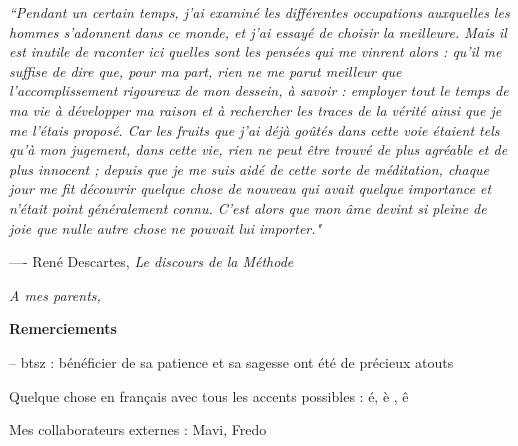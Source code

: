 \documentclass[12pt]{book}
\title{}
\date{}
\author{}
\begin{document}
\thispagestyle{empty}

\vspace*{5cm}

\textit{``Pendant un certain temps, j'ai examin\'e les diff\'erentes
occupations auxquelles les hommes s'adonnent dans ce monde, et j'ai
essay\'e de choisir la meilleure. Mais il est inutile de raconter ici
quelles sont les pens\'ees qui me vinrent alors : qu'il me suffise de
dire que, pour ma part, rien ne me parut meilleur que
l'accomplissement rigoureux de mon dessein, \`a savoir : employer tout
le temps de ma vie \`a d\'evelopper ma raison et \`a rechercher les
traces de la v\'erit\'e ainsi que je me l'\'etais propos\'e. Car les
fruits que j'ai d\'ej\`a go\^ut\'es dans cette voie \'etaient tels
qu'\`a mon jugement, dans cette vie, rien ne peut \^etre trouv\'e de
plus agr\'eable et de plus innocent ; depuis que je me suis aid\'e de
cette sorte de m\'editation, chaque jour me fit d\'ecouvrir quelque
chose de nouveau qui avait quelque importance et n'\'etait point
g\'en\'eralement connu. C'est alors que mon \^ame devint si pleine de
joie que nulle autre chose ne pouvait lui importer."}

\vspace*{1cm}

\hspace{4cm} ---- Ren\'e Descartes, \textit{Le discours de la M\'ethode}

\newpage

\thispagestyle{empty}
\quad 
\newpage

\thispagestyle{empty}
\vspace*{9cm}
\hspace{6cm} \textit{A mes parents,}
\newpage

\thispagestyle{empty}
\vspace*{.5cm}
\huge \textbf{Remerciements} \normalsize
\vspace*{1cm}


-- btsz : b\'en\'eficier de sa patience et sa sagesse ont \'et\'e de
pr\'ecieux atouts

Quelque chose en français avec tous les accents possibles : \'e, è , \^e 

Mes collaborateurs externes : Mavi, Fredo
\end{document}
